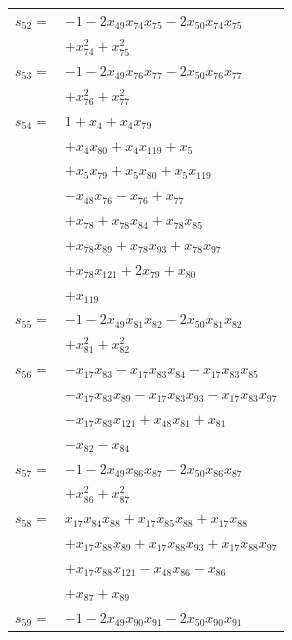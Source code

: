 \begin{longtable}{@{}r@{\;}l@{}}
\(s_{52}=\) & \(\displaystyle -1 -2x_{49}x_{74}x_{75} -2x_{50}x_{74}x_{75}\) \\
 & \(\displaystyle +x_{74}^{2} +x_{75}^{2}\) \\[3pt]
\(s_{53}=\) & \(\displaystyle -1 -2x_{49}x_{76}x_{77} -2x_{50}x_{76}x_{77}\) \\
 & \(\displaystyle +x_{76}^{2} +x_{77}^{2}\) \\[3pt]
\(s_{54}=\) & \(\displaystyle 1 +x_{4} +x_{4}x_{79}\) \\
 & \(\displaystyle +x_{4}x_{80} +x_{4}x_{119} +x_{5}\) \\
 & \(\displaystyle +x_{5}x_{79} +x_{5}x_{80} +x_{5}x_{119}\) \\
 & \(\displaystyle -x_{48}x_{76} -x_{76} +x_{77}\) \\
 & \(\displaystyle +x_{78} +x_{78}x_{84} +x_{78}x_{85}\) \\
 & \(\displaystyle +x_{78}x_{89} +x_{78}x_{93} +x_{78}x_{97}\) \\
 & \(\displaystyle +x_{78}x_{121} +2x_{79} +x_{80}\) \\
 & \(\displaystyle +x_{119}\) \\[3pt]
\(s_{55}=\) & \(\displaystyle -1 -2x_{49}x_{81}x_{82} -2x_{50}x_{81}x_{82}\) \\
 & \(\displaystyle +x_{81}^{2} +x_{82}^{2}\) \\[3pt]
\(s_{56}=\) & \(\displaystyle -x_{17}x_{83} -x_{17}x_{83}x_{84} -x_{17}x_{83}x_{85}\) \\
 & \(\displaystyle -x_{17}x_{83}x_{89} -x_{17}x_{83}x_{93} -x_{17}x_{83}x_{97}\) \\
 & \(\displaystyle -x_{17}x_{83}x_{121} +x_{48}x_{81} +x_{81}\) \\
 & \(\displaystyle -x_{82} -x_{84}\) \\[3pt]
\(s_{57}=\) & \(\displaystyle -1 -2x_{49}x_{86}x_{87} -2x_{50}x_{86}x_{87}\) \\
 & \(\displaystyle +x_{86}^{2} +x_{87}^{2}\) \\[3pt]
\(s_{58}=\) & \(\displaystyle x_{17}x_{84}x_{88} +x_{17}x_{85}x_{88} +x_{17}x_{88}\) \\
 & \(\displaystyle +x_{17}x_{88}x_{89} +x_{17}x_{88}x_{93} +x_{17}x_{88}x_{97}\) \\
 & \(\displaystyle +x_{17}x_{88}x_{121} -x_{48}x_{86} -x_{86}\) \\
 & \(\displaystyle +x_{87} +x_{89}\) \\[3pt]
\(s_{59}=\) & \(\displaystyle -1 -2x_{49}x_{90}x_{91} -2x_{50}x_{90}x_{91}\) \\

\end{longtable}
